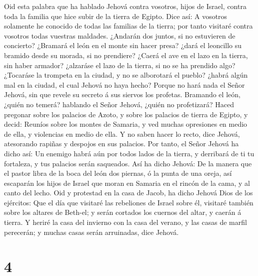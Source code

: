  Oid esta palabra que ha hablado Jehová contra vosotros,
hijos de Israel, contra toda la familia que hice subir de la tierra de
Egipto. Dice así:  A vosotros solamente he conocido de todas
las familias de la tierra; por tanto visitaré contra vosotros todas
vuestras maldades.  ¿Andarán dos juntos, si no estuvieren de
concierto?  ¿Bramará el león en el monte sin hacer presa?
¿dará el leoncillo su bramido desde su morada, si no prendiere?
 ¿Caerá el ave en el lazo en la tierra, sin haber armador?
¿alzaráse el lazo de la tierra, si no se ha prendido algo? 
¿Tocaráse la trompeta en la ciudad, y no se alborotará el pueblo? ¿habrá
algún mal en la ciudad, el cual Jehová no haya hecho? 
Porque no hará nada el Señor Jehová, sin que revele su secreto á sus
siervos los profetas.  Bramando el león, ¿quién no temerá?
hablando el Señor Jehová, ¿quién no profetizará?  Haced
pregonar sobre los palacios de Azoto, y sobre los palacios de tierra de
Egipto, y decid: Reuníos sobre los montes de Samaria, y ved muchas
opresiones en medio de ella, y violencias en medio de ella.
 Y no saben hacer lo recto, dice Jehová, atesorando rapiñas
y despojos en sus palacios.  Por tanto, el Señor Jehová ha
dicho así: Un enemigo habrá aún por todos lados de la tierra, y
derribará de ti tu fortaleza, y tus palacios serán saqueados.
 Así ha dicho Jehová: De la manera que el pastor libra de
la boca del león dos piernas, ó la punta de una oreja, así escaparán los
hijos de Israel que moran en Samaria en el rincón de la cama, y al canto
del lecho.  Oid y protestad en la casa de Jacob, ha dicho
Jehová Dios de los ejércitos:  Que el día que visitaré las
rebeliones de Israel sobre él, visitaré también sobre los altares de
Beth-el; y serán cortados los cuernos del altar, y caerán á tierra.
 Y heriré la casa del invierno con la casa del verano, y
las casas de marfil perecerán; y muchas casas serán arruinadas, dice
Jehová.

\hypertarget{section-3}{%
\section{4}\label{section-3}}

